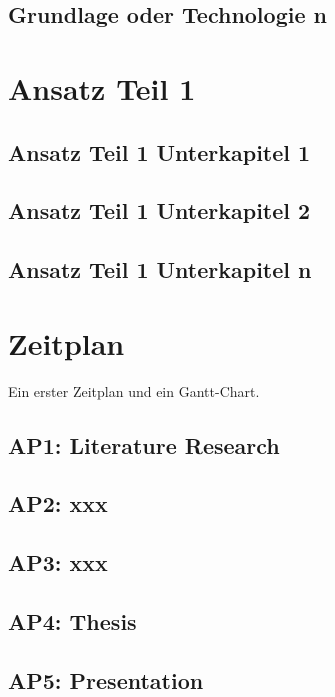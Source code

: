   \section{Grundlage oder Technologie n}
    \blindtext

\chapter{Ansatz Teil 1}\label{chp:Approach1}
  \section{Ansatz Teil 1 Unterkapitel 1}
    \blindtext
  \section{Ansatz Teil 1 Unterkapitel 2}
    \blindtext
  \section{Ansatz Teil 1 Unterkapitel n}
    \blindtext

\chapter{Zeitplan}\label{chp:Schedule}
  Ein erster Zeitplan und ein Gantt-Chart.
  \section{AP1: Literature Research}
  	\blindtext
  \section{AP2: xxx}
	\blindtext
  \section{AP3: xxx}
    \blindtext
  \section{AP4: Thesis}
    \blindtext
  \section{AP5: Presentation}
	\blindtext

